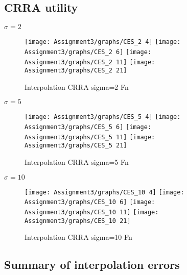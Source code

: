 \documentclass[]{article}
\begin{document}
\hypertarget{crra-utility}{%
\subsection{CRRA utility}\label{crra-utility}}

\(\sigma = 2\)

\begin{figure}

{\centering \texttt{[image: Assignment3/graphs/CES\_2 4]} \texttt{[image: Assignment3/graphs/CES\_2 6]} \texttt{[image: Assignment3/graphs/CES\_2 11]} \texttt{[image: Assignment3/graphs/CES\_2 21]} 

}

\caption{Interpolation CRRA sigma=2 Fn}\label{fig:unnamed-chunk-4}
\end{figure}

\(\sigma = 5\)

\begin{figure}

{\centering \texttt{[image: Assignment3/graphs/CES\_5 4]} \texttt{[image: Assignment3/graphs/CES\_5 6]} \texttt{[image: Assignment3/graphs/CES\_5 11]} \texttt{[image: Assignment3/graphs/CES\_5 21]} 

}

\caption{Interpolation CRRA sigma=5 Fn}\label{fig:unnamed-chunk-5}
\end{figure}

\(\sigma = 10\)

\begin{figure}

{\centering \texttt{[image: Assignment3/graphs/CES\_10 4]} \texttt{[image: Assignment3/graphs/CES\_10 6]} \texttt{[image: Assignment3/graphs/CES\_10 11]} \texttt{[image: Assignment3/graphs/CES\_10 21]} 

}

\caption{Interpolation CRRA sigma=10 Fn}\label{fig:unnamed-chunk-6}
\end{figure}

\hypertarget{summary-of-interpolation-errors}{%
\subsection{Summary of interpolation
errors}\label{summary-of-interpolation-errors}}
\end{document}
